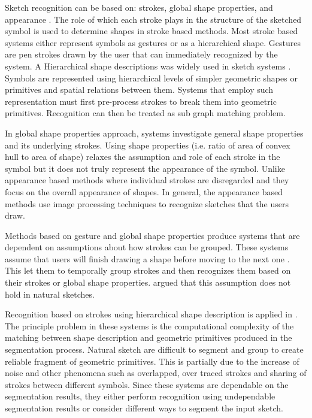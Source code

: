 \documentclass{article}
\begin{document}
Sketch recognition can be based on: strokes, global shape properties, and appearance \cite{Oltmans07}. The role of which each stroke plays in the structure of the sketched symbol is used to determine shapes in stroke based methods. Most stroke based systems either represent symbols as gestures or as a  hierarchical shape. Gestures are pen strokes drawn by the user that can immediately recognized by the system. A Hierarchical shape descriptions was widely used in sketch systems \cite{HierarchicalParsing7,Ladder30,AlvaradoFreedom42,SketchRead2007}. Symbols are represented using hierarchical levels of simpler geometric shapes or primitives and spatial relations between them. Systems that employ such representation must first pre-process strokes to break them into geometric primitives. Recognition can then be treated as sub graph matching problem.   

 In global shape properties approach, systems investigate general shape properties and its underlying strokes. Using shape properties (i.e. ratio of area of convex hull to area of shape) relaxes the assumption and role of each stroke in the symbol but it does not truly represent the appearance of the symbol\cite{DiagramOfflineConvexHull}. Unlike appearance based methods where individual strokes are disregarded and they focus on the overall appearance of shapes. In general, the  appearance based methods use image processing techniques to recognize sketches that the users draw. 
  
 Methods based on gesture and global shape properties produce systems that are dependent on assumptions about how strokes can be grouped. These systems assume that users will finish drawing a shape before moving to the next one \cite{Cali63,geometrydomain49}. This let them to temporally group strokes and then recognizes them based on their strokes or global shape properties. \cite{AlvaradoDigital} argued that this assumption does not hold in natural sketches.
 
 Recognition based on strokes using hierarchical shape description is applied in \cite{SketchRead2007}. The principle problem in these systems is the computational complexity of the matching between shape description and geometric primitives produced in the segmentation process. Natural sketch are difficult to segment and group to create reliable fragment of geometric primitives. This is partially due to the increase of noise and other phenomena such as overlapped, over traced strokes and sharing of strokes between different symbols. Since these systems are dependable on the segmentation results, they either perform recognition using undependable segmentation results or consider different ways to segment the input sketch. 
 
\end{document}
